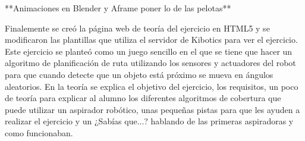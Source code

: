 **Animaciones en Blender y Aframe poner lo de las pelotas**

Finalemente se creó la página web de teoría del ejercicio en HTML5 y se modificaron las plantillas que utiliza el servidor de Kibotics para ver el ejercicio. Este ejercicio se planteó como un juego sencillo en el que se tiene que hacer un algoritmo de planificación de ruta utilizando los sensores y actuadores del robot  para que cuando detecte que un objeto está próximo se mueva en ángulos aleatorios. 
En la teoría se explica el objetivo del ejercicio, los requisitos, un poco de teoría para explicar al alumno los diferentes algoritmos de cobertura que puede utilizar  un aspirador robótico, unas pequeñas pistas para que les ayuden a realizar el ejercicio y un ¿Sabías que...? hablando de las primeras aspiradoras y como funcionaban. 


